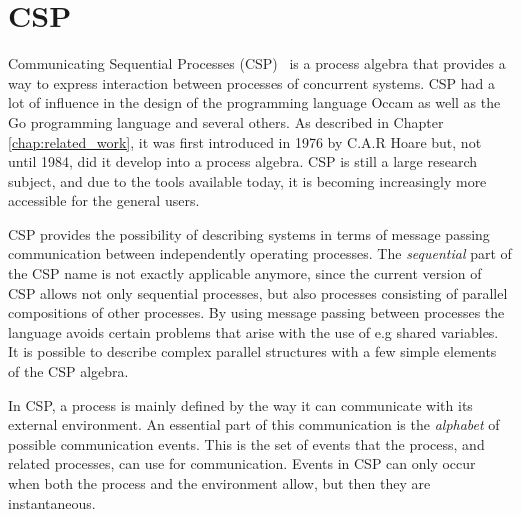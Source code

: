 \section{CSP}
\label{sec:csp_background}
Communicating Sequential Processes (CSP)~\cite{Hoare1978} is a process algebra that provides a way to express interaction between processes of concurrent systems.
CSP had a lot of influence in the design of the programming language Occam as well as the Go programming language and several others. As described in Chapter \ref{chap:related_work}, it was first introduced in 1976 by C.A.R Hoare but, not until 1984, did it develop into a process algebra. CSP is still a large research subject, and due to the tools available today, it is becoming increasingly more accessible for the general users.

CSP provides the possibility of describing systems in terms of message passing communication between independently operating processes. The \textit{sequential} part of the CSP name is not exactly applicable anymore, since the current version of CSP allows not only sequential processes, but also processes consisting of parallel compositions of other processes.
By using message passing between processes the language avoids certain problems that arise with the use of e.g shared variables.
It is possible to describe complex parallel structures with a few simple elements of the CSP algebra.

In CSP, a process is mainly defined by the way it can communicate with its external environment. An essential part of this communication is the \textit{alphabet} of possible communication events. This is the set of events that the process, and related processes, can use for communication. Events in CSP can only occur when both the process and the environment allow, but then they are instantaneous.

